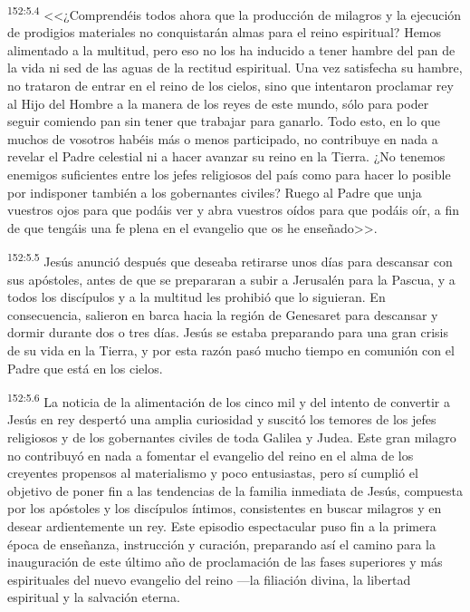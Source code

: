\par 
\textsuperscript{152:5.4} <<¿Comprendéis todos ahora que la producción de milagros y la ejecución de prodigios materiales no conquistarán almas para el reino espiritual? Hemos alimentado a la multitud, pero eso no los ha inducido a tener hambre del pan de la vida ni sed de las aguas de la rectitud espiritual. Una vez satisfecha su hambre, no trataron de entrar en el reino de los cielos, sino que intentaron proclamar rey al Hijo del Hombre a la manera de los reyes de este mundo, sólo para poder seguir comiendo pan sin tener que trabajar para ganarlo. Todo esto, en lo que muchos de vosotros habéis más o menos participado, no contribuye en nada a revelar el Padre celestial ni a hacer avanzar su reino en la Tierra. ¿No tenemos enemigos suficientes entre los jefes religiosos del país como para hacer lo posible por indisponer también a los gobernantes civiles? Ruego al Padre que unja vuestros ojos para que podáis ver y abra vuestros oídos para que podáis oír, a fin de que tengáis una fe plena en el evangelio que os he enseñado>>.

\par 
\textsuperscript{152:5.5} Jesús anunció después que deseaba retirarse unos días para descansar con sus apóstoles, antes de que se prepararan a subir a Jerusalén para la Pascua, y a todos los discípulos y a la multitud les prohibió que lo siguieran. En consecuencia, salieron en barca hacia la región de Genesaret para descansar y dormir durante dos o tres días. Jesús se estaba preparando para una gran crisis de su vida en la Tierra, y por esta razón pasó mucho tiempo en comunión con el Padre que está en los cielos.

\par 
\textsuperscript{152:5.6} La noticia de la alimentación de los cinco mil y del intento de convertir a Jesús en rey despertó una amplia curiosidad y suscitó los temores de los jefes religiosos y de los gobernantes civiles de toda Galilea y Judea. Este gran milagro no contribuyó en nada a fomentar el evangelio del reino en el alma de los creyentes propensos al materialismo y poco entusiastas, pero sí cumplió el objetivo de poner fin a las tendencias de la familia inmediata de Jesús, compuesta por los apóstoles y los discípulos íntimos, consistentes en buscar milagros y en desear ardientemente un rey. Este episodio espectacular puso fin a la primera época de enseñanza, instrucción y curación, preparando así el camino para la inauguración de este último año de proclamación de las fases superiores y más espirituales del nuevo evangelio del reino ---la filiación divina, la libertad espiritual y la salvación eterna.

